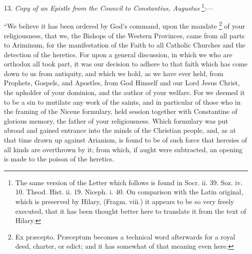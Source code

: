 13. \emph{Copy of an Epistle from
the Council to Constantius, Augustus} \footnote{The same version of the Letter which follows is found in Socr. ii. 39.
Soz. iv. 10. Theod. Hist. ii. 19. Niceph. i. 40. On comparison with
the Latin original, which is preserved by Hilary, (Fragm. viii.) it
appears to be so very freely executed, that it has been thought better
here to translate it from the text of Hilary.}:—

``We believe it has been
ordered by God's command, upon the mandate \footnote{Ex præcepto. Præceptum becomes a technical word afterwards for a
royal deed, charter, or edict; and it has somewhat of that meaning
even here.} of your religiousness, that we, the Bishops of the Western
Provinces, came from all parts to Ariminum, for the manifestation of
the Faith to all Catholic Churches and the detection of the heretics.
For upon a general discussion, in which we who are orthodox all took
part, it was our decision to adhere to that faith which has come
down to us from antiquity, and which we hold, as we have ever held,
from Prophets, Gospels, and Apostles, from God Himself and our Lord
Jesus Christ, the upholder of your dominion, and the author of your
welfare. For we deemed it to be a sin to mutilate any work of the
saints, and in particular of those who in the framing of the Nicene
formulary, held session together with Constantine of glorious memory,
the father of your religiousness. Which formulary was put abroad and
gained entrance into the minds of the Christian people, and, as at
that time drawn up against Arianism, is found to be of such force that
heresies of all kinds are overthrown by it; from which, if aught were
subtracted, an opening is made to the poison of the heretics.

